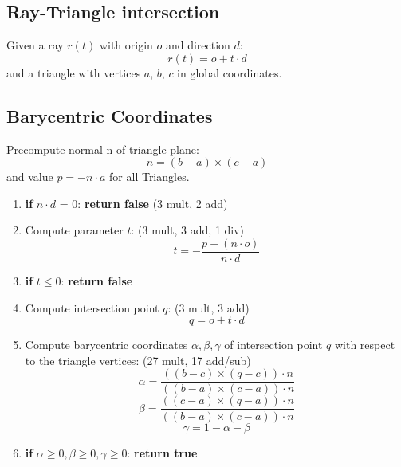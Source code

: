 \documentclass{article}
\begin{document}
\subsection*{Ray-Triangle intersection}
Given a ray $r(t)$ with origin $o$ and direction $d$:
\begin{equation*}
  r(t) = o + t \cdot d
\end{equation*}
and a triangle with vertices $a$, $b$, $c$ in global coordinates.
\subsection*{ Barycentric Coordinates }


Precompute normal n of triangle plane:
        \begin{equation*}
            n = (b-a) \times (c-a)
        \end{equation*}
    and value $p = - n \cdot a$ for all Triangles.
\begin{enumerate}
    \item \textbf{if } $n \cdot d$ = 0: \textbf{return false } (3 mult, 2 add)
    \item Compute parameter $t$: (3 mult, 3 add, 1 div)
        \begin{equation*}
            t = -\frac{p + (n \cdot o)}{n \cdot d}
        \end{equation*}
    \item \textbf{if} $t \leq 0$: \textbf{return false }
    \item Compute intersection point $q$: (3 mult, 3 add)
        \begin{equation*}
            q = o + t \cdot d
        \end{equation*}
    \item Compute barycentric coordinates $\alpha, \beta, \gamma$ of intersection point $q$ with respect to the triangle vertices: (27 mult, 17 add/sub)
        \begin{equation*}
                \alpha = \frac{((b-c) \times (q-c))\cdot n}{((b-a) \times (c-a)) \cdot n}
        \end{equation*}
        \begin{equation*}
                \beta = \frac{((c-a) \times (q-a))\cdot n}{((b-a) \times (c-a)) \cdot n}
        \end{equation*}
         \begin{equation*}
                \gamma = 1 - \alpha - \beta
        \end{equation*}
    \item \textbf{if }$\alpha \geq 0, \beta \geq 0, \gamma \geq 0$: \textbf{return true}
\end{enumerate}
\end{document}
